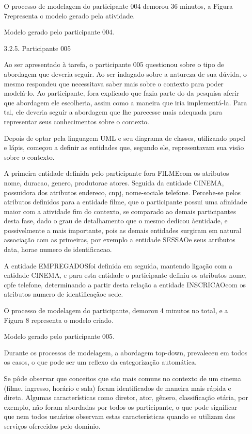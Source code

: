 O processo de modelagem do participante 004 demorou 36 minutos, a Figura 7representa o modelo gerado pela atividade.


Modelo gerado pelo participante 004.


3.2.5. Participante 005

Ao ser apresentado à tarefa, o participante 005 questionou sobre o tipo de abordagem que deveria seguir. Ao ser indagado sobre a natureza de sua dúvida, o mesmo respondeu que necessitava saber mais sobre o contexto para poder modelá-lo. Ao participante, fora explicado que fazia parte do da pesquisa aferir que abordagem ele escolheria, assim como a maneira que iria implementá-la. Para tal, ele deveria seguir a abordagem que lhe parecesse mais adequada para representar seus conhecimentos sobre o contexto.

Depois de optar pela linguagem UML e seu diagrama de classes, utilizando papel e lápis, começou a definir as entidades que, segundo ele, representavam sua visão sobre o contexto.

A primeira entidade definida pelo participante fora FILMEcom os atributos nome, duracao, genero, produtorae atores. Seguida da entidade CINEMA, possuidora dos atributos endereco, cnpj, nome-sociale telefone. Percebe-se pelos atributos definidos para a entidade filme, que o participante possui uma afinidade maior com a atividade fim do contexto, se comparado ao demais participantes desta fase, dado o grau de detalhamento que o mesmo dedicou àentidade, e possivelmente a mais importante, pois as demais entidades surgiram em natural associação com as primeiras, por exemplo a entidade SESSAOe seus atributos data, horae numero de identificacao.

A entidade EMPREGADOSfoi definida em seguida, mantendo ligação com a entidade CINEMA, e para esta entidade o participante definiu os atributos nome, cpfe telefone, determinando a partir desta relação a entidade INSCRICAOcom os atributos numero de identificaçãoe sede.

O processo de modelagem do participante, demorou 4 minutos no total, e a Figura 8 representa o modelo criado.


Modelo gerado pelo participante 005.


Durante os processos de modelagem, a abordagem top-down, prevaleceu em todos os casos, o que pode ser um reflexo da categorização automática.

Se pôde observar que conceitos que são mais comuns no contexto de um cinema (filme, ingresso, horário e sala) foram identificados de maneira mais rápida e direta. Algumas características como diretor, ator, gênero, classificação etária, por exemplo, não foram abordadas por todos os participante, o que pode significar que nem todos usuários observam estas características quando se utilizam dos serviços oferecidos pelo domínio.

